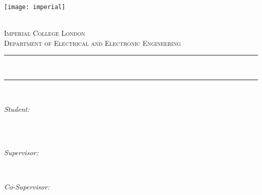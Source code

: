 \begin{titlepage}

\newcommand{\HRule}{\rule{\linewidth}{0.5mm}} %


\texttt{[image: imperial]} %


\center %

\quad\\[1.5cm]
\textsc{\Large Imperial College London}\\[0.5cm] %
\textsc{\large Department of Electrical and Electronic Engineering}\\[2cm] %

\makeatletter
\HRule \\[0.5cm]
{ \LARGE \textbf{\project}} %
\HRule \\[2cm]


\begin{minipage}[t]{0.31\textwidth}
\centering
\large
\emph{Student:}\\
\student\\
\end{minipage}
~
\begin{minipage}[t]{0.31\textwidth}
\centering
\large
\emph{Supervisor:} \\
\supervisor %
\end{minipage}
~
\begin{minipage}[t]{0.31\textwidth}
\centering
\large
\emph{Co-Supervisor:} \\
\cosupervisor %
\end{minipage}\\[3cm]
\makeatother


\end{titlepage}
